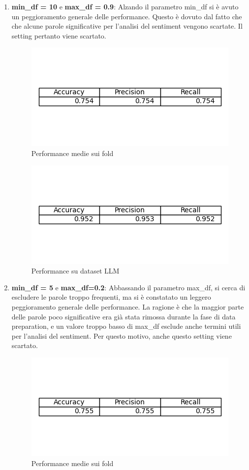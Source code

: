 \documentclass[12pt,a4paper]{report} %
\begin{document}
\begin{enumerate}
\begin{figure}[H]
\end{figure}
\item \textbf{min\_df = 10} e \textbf{max\_df = 0.9}: Alzando il parametro min\_df si è avuto un peggioramento generale delle performance. Questo è dovuto dal fatto che che alcune parole significative per l'analisi del sentiment vengono scartate. Il setting pertanto viene scartato.
\begin{figure}[H]
    \centering
    \includegraphics[width=0.75\linewidth]{immagini_modeling/parameter3.png}
    \caption{Performance medie sui fold}
    \label{fig:enter-label}
\end{figure}
\begin{figure}[H]
    \centering
    \includegraphics[width=0.75\linewidth]{immagini_modeling/parameter4.png}
    \caption{Performance su dataset LLM}
    \label{fig:enter-label}
\end{figure}
\item \textbf{min\_df = 5} e \textbf{max\_df=0.2}: Abbassando il parametro max\_df, si cerca di escludere le parole troppo frequenti, ma si è constatato un leggero peggioramento generale delle performance. La ragione è che la maggior parte delle parole poco significative era già stata rimossa durante la fase di data preparation, e un valore troppo basso di max\_df esclude anche termini utili per l’analisi del sentiment. Per questo motivo, anche questo setting viene scartato. 
\begin{figure}[H]
    \centering
    \includegraphics[width=0.75\linewidth]{immagini_modeling/parameter5.png}
    \caption{Performance medie sui fold}
    \label{fig:enter-label}
\end{figure}
\end{enumerate}
\end{document}
